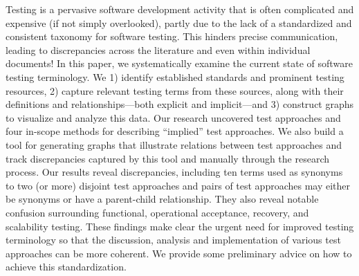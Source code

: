 \label{abstract}%
Testing is a pervasive software development activity that is often
complicated and expensive (if not simply overlooked), partly due to
the lack of a standardized and consistent taxonomy for software testing.
This hinders precise communication, leading to discrepancies across the
literature and even within individual documents!
In this paper, we systematically examine the current state of software
testing terminology. We 1) identify established standards
and prominent testing resources, 2) capture relevant testing terms
from these sources, along with their definitions and relationships---both
explicit and implicit---and 3) construct graphs to visualize and analyze
this data. Our research uncovered \approachCount{} test approaches and
four in-scope methods for describing ``implied'' test approaches. We also build
a tool for generating graphs that illustrate relations between test
approaches and track discrepancies captured by this tool and manually through
the research process. Our results reveal \totalDiscreps{} discrepancies,
including ten terms used as synonyms to two (or more)
disjoint test approaches and \parSynCount{} pairs of test approaches may
either be synonyms or have a parent-child relationship. They also reveal
notable confusion surrounding functional, operational acceptance, recovery,
and scalability testing. These findings make clear
the urgent need for improved testing terminology so that the discussion,
analysis and implementation of various test approaches can be more coherent.
We provide some preliminary advice on how to achieve this standardization.